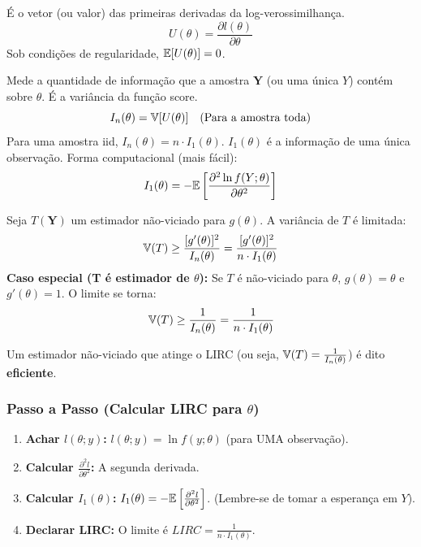 \begin{propriedade}
\begin{definicao}
É o vetor (ou valor) das primeiras derivadas da log-verossimilhança.
$$ U(\theta) = \frac{\partial l(\theta)}{\partial \theta} $$
Sob condições de regularidade, $\mathbb{E}[U(\theta)] = 0$.
\end{definicao}

\begin{definicao}
Mede a quantidade de informação que a amostra $\boldsymbol{Y}$ (ou uma única $Y$) contém sobre $\theta$. É a variância da função score.
$$ I_n(\theta) = \mathbb{V}[U(\theta)] \quad \text{(Para a amostra toda)}$$
Para uma amostra iid, $I_n(\theta) = n \cdot I_1(\theta)$. $I_1(\theta)$ é a informação de uma única observação.
Forma computacional (mais fácil):
$$ I_1(\theta) = -\mathbb{E}\left[ \frac{\partial^2 \ln f(Y; \theta)}{\partial \theta^2} \right] $$
\end{definicao}

\begin{teorema}
Seja $T(\boldsymbol{Y})$ um estimador não-viciado para $g(\theta)$. A variância de $T$ é limitada:
$$ \mathbb{V}(T) \ge \frac{[g'(\theta)]^2}{I_n(\theta)} = \frac{[g'(\theta)]^2}{n \cdot I_1(\theta)} $$
\textbf{Caso especial (T é estimador de $\theta$):}
Se $T$ é não-viciado para $\theta$, $g(\theta)=\theta$ e $g'(\theta)=1$. O limite se torna:
$$ \mathbb{V}(T) \ge \frac{1}{I_n(\theta)} = \frac{1}{n \cdot I_1(\theta)} $$
\end{teorema}
\begin{definicao}[Eficiência]
Um estimador não-viciado que atinge o LIRC (ou seja, $\mathbb{V}(T) = \frac{1}{I_n(\theta)}$) é dito \textbf{eficiente}.
\end{definicao}

\subsubsection{Passo a Passo (Calcular LIRC para $\theta$)}
\begin{enumerate}
    \item \textbf{Achar $l(\theta; y)$:} $l(\theta; y) = \ln f(y; \theta)$ (para UMA observação).
    \item \textbf{Calcular $\frac{\partial^2 l}{\partial \theta^2}$:} A segunda derivada.
    \item \textbf{Calcular $I_1(\theta)$:} $I_1(\theta) = -\mathbb{E}\left[ \frac{\partial^2 l}{\partial \theta^2} \right]$. (Lembre-se de tomar a esperança em $Y$).
    \item \textbf{Declarar LIRC:} O limite é $LIRC = \frac{1}{n \cdot I_1(\theta)}$.
\end{enumerate}


\end{propriedade}
